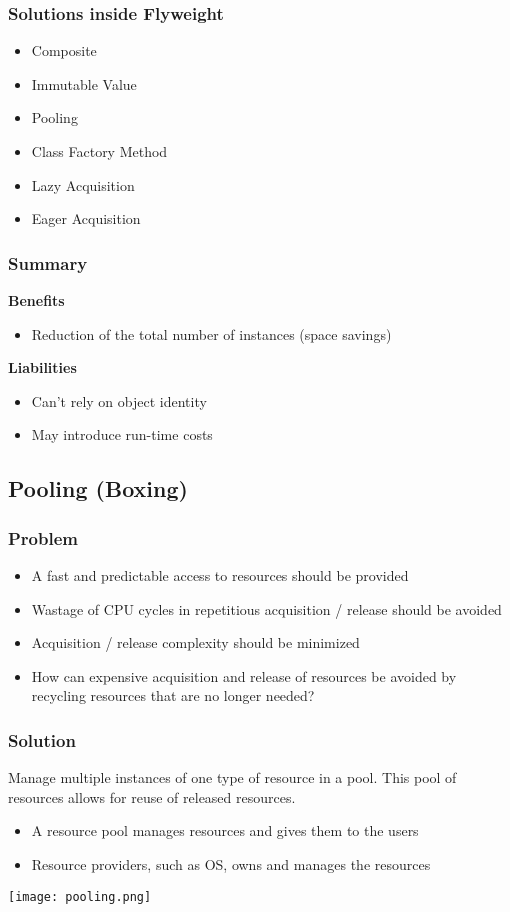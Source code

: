 \subsubsection{Solutions inside Flyweight}
\begin{itemize}
    \item Composite
    \item Immutable Value
    \item Pooling
    \item Class Factory Method
    \item Lazy Acquisition
    \item Eager Acquisition
\end{itemize}
\subsubsection{Summary}
\textbf{Benefits}
\begin{itemize}
    \item Reduction of the total number of instances (space savings)
\end{itemize}
\textbf{Liabilities}
\begin{itemize}
    \item Can't rely on object identity
    \item May introduce run-time costs
\end{itemize}

\subsection{Pooling (Boxing)}
\subsubsection{Problem}
\begin{itemize}
    \item A fast and predictable access to resources should be provided
    \item Wastage of CPU cycles in repetitious acquisition / release should be avoided
    \item Acquisition / release complexity should be minimized
    \item How can expensive acquisition and release of resources be avoided by recycling resources that are no longer needed?
\end{itemize}
\subsubsection{Solution}
Manage multiple instances of one type of resource in a pool. This pool of resources allows for reuse of released resources.
\begin{itemize}
    \item A resource pool manages resources and gives them to the users
    \item Resource providers, such as OS, owns and manages the resources
\end{itemize}
\texttt{[image: pooling.png]}
